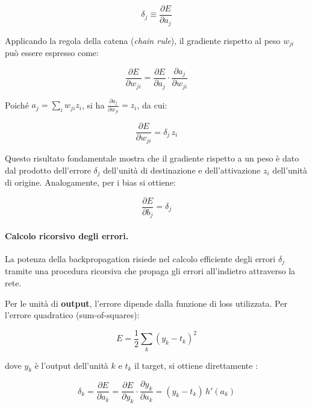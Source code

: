 \begin{equation}
\delta_j \equiv \frac{\partial E}{\partial a_j}
\label{eq:delta}
\end{equation}

Applicando la regola della catena (\textit{chain rule}), il gradiente rispetto al peso $w_{ji}$ può essere espresso come:

\begin{equation}
\frac{\partial E}{\partial w_{ji}} = \frac{\partial E}{\partial a_j} \cdot \frac{\partial a_j}{\partial w_{ji}}
\end{equation}

Poiché $a_j = \sum_i w_{ji} z_i$, si ha $\frac{\partial a_j}{\partial w_{ji}} = z_i$, da cui:

\begin{equation}
\frac{\partial E}{\partial w_{ji}} = \delta_j \, z_i
\label{eq:gradient_weight}
\end{equation}

Questo risultato fondamentale mostra che il gradiente rispetto a un peso è dato dal prodotto dell'errore $\delta_j$ dell'unità di destinazione e dell'attivazione $z_i$ dell'unità di origine. Analogamente, per i bias si ottiene:

\begin{equation}
\frac{\partial E}{\partial b_j} = \delta_j
\end{equation}

\paragraph{Calcolo ricorsivo degli errori.} La potenza della backpropagation risiede nel calcolo efficiente degli errori $\delta_j$ tramite una procedura ricorsiva che propaga gli errori all'indietro attraverso la rete.

Per le unità di \textbf{output}, l'errore dipende dalla funzione di loss utilizzata. Per l'errore quadratico (sum-of-squares):

\begin{equation}
E = \frac{1}{2} \sum_k (y_k - t_k)^2
\end{equation}

dove $y_k$ è l'output dell'unità $k$ e $t_k$ il target, si ottiene direttamente \cite{bishop2006pattern}:

\begin{equation}
\delta_k = \frac{\partial E}{\partial a_k} = \frac{\partial E}{\partial y_k} \cdot \frac{\partial y_k}{\partial a_k} = (y_k - t_k) \, h'(a_k)
\label{eq:delta_output}
\end{equation}

